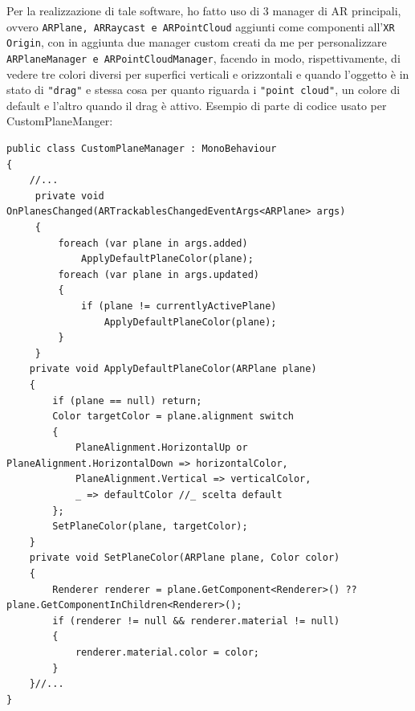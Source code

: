 Per la realizzazione di tale software, ho fatto uso di 3 manager di AR principali, ovvero \texttt{ARPlane, ARRaycast e ARPointCloud} aggiunti come componenti all'\texttt{XR Origin}, con in aggiunta due manager custom creati da me per personalizzare \texttt{ARPlaneManager e ARPointCloudManager}, facendo in modo, rispettivamente, di vedere tre colori diversi per superfici verticali e orizzontali e quando l'oggetto è in stato di \texttt{"drag"} e stessa cosa per quanto riguarda i \texttt{"point cloud"}, un colore di default e l'altro quando il drag è attivo. Esempio di parte di codice usato per CustomPlaneManger: 
\begin{lstlisting}[language={[Sharp]C}]
public class CustomPlaneManager : MonoBehaviour
{
    //...
     private void OnPlanesChanged(ARTrackablesChangedEventArgs<ARPlane> args)
     {
         foreach (var plane in args.added)
             ApplyDefaultPlaneColor(plane);
         foreach (var plane in args.updated)
         {
             if (plane != currentlyActivePlane)
                 ApplyDefaultPlaneColor(plane);
         }
     }
    private void ApplyDefaultPlaneColor(ARPlane plane)
    {
        if (plane == null) return;
        Color targetColor = plane.alignment switch
        {
            PlaneAlignment.HorizontalUp or PlaneAlignment.HorizontalDown => horizontalColor,
            PlaneAlignment.Vertical => verticalColor,
            _ => defaultColor //_ scelta default
        };
        SetPlaneColor(plane, targetColor);
    }
    private void SetPlaneColor(ARPlane plane, Color color)
    {
        Renderer renderer = plane.GetComponent<Renderer>() ?? plane.GetComponentInChildren<Renderer>();
        if (renderer != null && renderer.material != null)
        {
            renderer.material.color = color;
        }
    }//...
}
\end{lstlisting}


